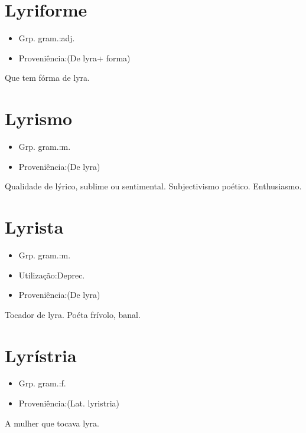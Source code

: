 \section{Lyriforme}
\begin{itemize}
\item {Grp. gram.:adj.}
\end{itemize}
\begin{itemize}
\item {Proveniência:(De \textunderscore lyra\textunderscore  + \textunderscore forma\textunderscore )}
\end{itemize}
Que tem fórma de lyra.
\section{Lyrismo}
\begin{itemize}
\item {Grp. gram.:m.}
\end{itemize}
\begin{itemize}
\item {Proveniência:(De \textunderscore lyra\textunderscore )}
\end{itemize}
Qualidade de lýrico, sublime ou sentimental.
Subjectivismo poético.
Enthusiasmo.
\section{Lyrista}
\begin{itemize}
\item {Grp. gram.:m.}
\end{itemize}
\begin{itemize}
\item {Utilização:Deprec.}
\end{itemize}
\begin{itemize}
\item {Proveniência:(De \textunderscore lyra\textunderscore )}
\end{itemize}
Tocador de lyra.
Poéta frívolo, banal.
\section{Lyrístria}
\begin{itemize}
\item {Grp. gram.:f.}
\end{itemize}
\begin{itemize}
\item {Proveniência:(Lat. \textunderscore lyristria\textunderscore )}
\end{itemize}
A mulher que tocava lyra.
